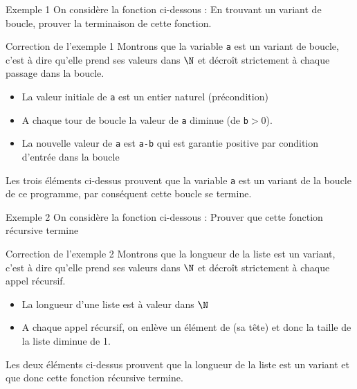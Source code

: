 \documentclass[10pt]{beamer}
\begin{document}
\begin{frame}[fragile]{\Ctitle}{\stitle}
	\begin{exampleblock}{Exemple 1}
		On considère la fonction ci-dessous :
		\onslide<2-> En trouvant un variant de boucle, prouver la terminaison de cette fonction.
	\end{exampleblock}
\end{frame}

\begin{frame}[fragile]{\Ctitle}{\stitle}
	\begin{exampleblock}{Correction de l'exemple 1}
		\textcolor{OliveGreen}{Montrons que la variable {\tt a} est un variant de boucle, c'est à dire qu'elle prend ses valeurs dans $\N$ et  décroît strictement à chaque passage dans la boucle.}
		\begin{itemize}
			\item<2->{\textcolor{OliveGreen}{La valeur initiale de \texttt{a} est un entier naturel (précondition)}}
			\item<3->{\textcolor{OliveGreen}{A chaque tour de boucle la valeur de \texttt{a} diminue (de \texttt{b}$>0$).}}
			\item<4->{\textcolor{OliveGreen}{La nouvelle valeur de \texttt{a} est \texttt{a-b} qui est garantie positive par condition d'entrée dans la boucle}}
		\end{itemize}
		\textcolor{OliveGreen}{Les trois éléments ci-dessus prouvent que la variable {\tt a} est un variant de la boucle  de ce programme, par conséquent cette boucle se termine.}
	\end{exampleblock}
\end{frame}

\begin{frame}[fragile]{\Ctitle}{\stitle}
	\begin{exampleblock}{Exemple 2}
		On considère la fonction ci-dessous :
		\onslide<2-> Prouver que cette fonction récursive termine
	\end{exampleblock}
\end{frame}

\begin{frame}[fragile]{\Ctitle}{\stitle}
	\begin{exampleblock}{Correction de l'exemple 2}
		\textcolor{OliveGreen}{Montrons que la longueur de la liste  est un variant, c'est à dire qu'elle prend ses valeurs dans $\N$ et  décroît strictement à chaque appel récursif.}
		\begin{itemize}
			\item<2->{\textcolor{OliveGreen}{La longueur d'une liste est à valeur dans $\N$}}
			\item<3->{\textcolor{OliveGreen}{A chaque appel récursif, on enlève un élément de  (sa tête) et donc la taille de la liste diminue de 1.}}
		\end{itemize}
		\textcolor{OliveGreen}{Les deux éléments ci-dessus prouvent que la longueur de la liste est un variant et que donc cette fonction récursive termine.}
	\end{exampleblock}
\end{frame}
\end{document}
